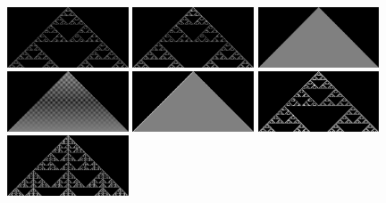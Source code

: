 \documentclass{article}
\begin{document}
\begin{figure}[h]
    \centering
    \includegraphics[width=0.32\textwidth]{ca-rules/single1/rule-018-090-146-218.png}%
    \hspace{0.01\textwidth}%
    \includegraphics[width=0.32\textwidth]{ca-rules/single1/rule-022.png}\hspace{0.01\textwidth}%
    \includegraphics[width=0.32\textwidth]{ca-rules/single1/rule-050-122-178-250.png}\\
    \vspace{0.01\textwidth}%
    \includegraphics[width=0.32\textwidth]{ca-rules/single1/rule-054.png}\hspace{0.01\textwidth}%
    \includegraphics[width=0.32\textwidth]{ca-rules/single1/rule-094.png}\hspace{0.01\textwidth}%
    \includegraphics[width=0.32\textwidth]{ca-rules/single1/rule-126.png}\\
    \vspace{0.01\textwidth}
    \includegraphics[width=0.32\textwidth]{ca-rules/single1/rule-150.png}\hspace{0.01\textwidth}%

\end{figure}
\end{document}
